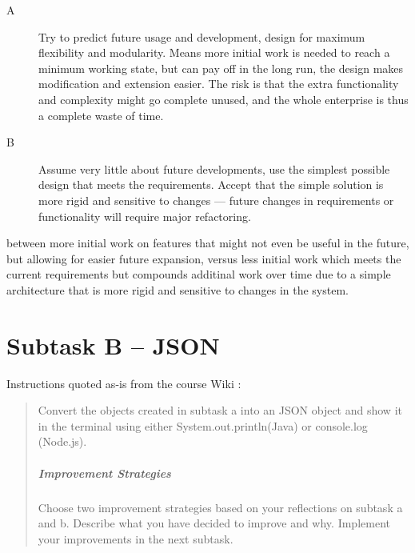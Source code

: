 \begin{description}
  \item [A] Try to predict future usage and development, design for maximum 
        flexibility and modularity. Means more initial work is needed to reach
        a minimum working state, but can pay off in the long run, the design
        makes modification and extension easier.  The risk is that the extra
        functionality and complexity might go complete unused, and the whole
        enterprise is thus a complete waste of time.
  \item [B] Assume very little about future developments, use the simplest 
        possible design that meets the requirements. Accept that the simple 
        solution is more rigid and sensitive to changes --- future changes in 
        requirements or functionality will require major refactoring.
\end{description}


between more initial work on features that might not even
be useful in the future, but allowing for easier future expansion, versus less
initial work which meets the current requirements but compounds additinal work
over time due to a simple architecture that is more rigid and sensitive to
changes in the system.


\section{Subtask B -- JSON}\label{subtask-b-json}
Instructions quoted as-is from the course Wiki \cite{1dv600:lab1:instructions}:

\begin{quote}
  Convert the objects created in subtask a into an JSON object and show it in
  the terminal using either System.out.println(Java) or console.log (Node.js).
  
  \subparagraph{Improvement Strategies}
  
  Choose two improvement strategies based on your reflections on subtask a and
  b. Describe what you have decided to improve and why. Implement your 
  improvements in the next subtask.
\end{quote}

